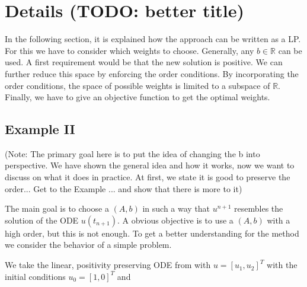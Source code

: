 \documentclass[a4paper]{scrartcl}
\numberwithin{equation}{section}
\theoremstyle{plain}
\theoremstyle{definition}
\numberwithin{theorem}{section}
\newcommand{\R}{\mathbb{R}}
\newcommand{\1}{\mathbbm{1}}
\begin{document}
\section{Details (TODO: better title)}\label{sec:LP}

In the following section, it is explained how the approach can be written as a LP. 
For this we have to consider which weights to choose. 
Generally, any $b \in \R$ can be used. 
A first requirement would be that the new solution is positive.
We can further reduce this space by enforcing the order conditions. 
By incorporating the order conditions, the space of possible weights is limited to a subspace of $\R$. %
Finally, we have to give an objective function to get the optimal weights.


\subsection{Example II}\label{sec:example_lin}

(Note: The primary goal here is to put the idea of changing the b into perspective. We have shown the general idea and how it works, now we want to discuss on what it does in practice. At first, we state it is good to preserve the order... Get to the Example ... and show that there is more to it)


The main goal is to choose a $(A,b)$ in such a way that $u^{n+1}$ resembles the solution of the ODE $u(t_{n+1})$. 
A obvious objective is to use a $(A,b)$ with a high order, but this is not enough.
To get a better understanding for the method we consider the behavior of a simple problem.   

We take the linear, positivity preserving ODE from \cite{kopecz_unconditionally_2018} with $u = [u_1,u_2]^T$ with the initial conditions $u_0 = [1,0]^T$ and
\end{document}
